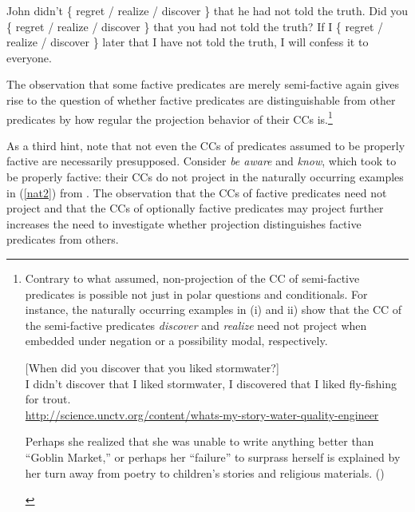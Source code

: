 \documentclass[11pt,fleqn]{article}
\newcommand{\6}{\mbox{$[\hspace*{-.6mm}[$}}
\newcommand{\9}{\mbox{$]\hspace*{-.6mm}]$}}
\begin{document}
\begin{exe}
\ex\label{kart2} \citealt[63f.]{karttunen71b}
\begin{xlist}
\ex John didn't \{ regret / realize / discover \} that he had not told the truth.
\ex  Did you \{ regret / realize / discover \} that you had not told the truth?
\ex  If I \{ regret / realize / discover \} later that I have not told the truth, I will confess it to everyone.
\end{xlist}
\end{exe}
The observation that some factive predicates are merely semi-factive again gives rise to the question of whether factive predicates are distinguishable from other predicates by how regular the projection behavior of their CCs is.\footnote{Contrary to what \citealt{karttunen71b} assumed, non-projection of the CC of semi-factive predicates is possible not just in polar questions and conditionals. For instance, the naturally occurring examples in (i) and ii) show that the CC of the semi-factive predicates {\em discover} and {\em realize} need not project when embedded under negation or a possibility modal, respectively.

\begin{exe}
 {[}When did you discover that you liked stormwater?] \\ I didn't discover that I liked stormwater, I discovered that I liked fly-fishing for trout.\\ \url{http://science.unctv.org/content/whats-my-story-water-quality-engineer}

 Perhaps she realized that she was unable to write anything better than ``Goblin Market,'' or perhaps her ``failure'' to surprass herself is explained by her turn away from poetry to children's stories and religious materials. \hfill (\citealt[87]{beaver-belly})
\end{exe}
}

As a third hint, note that not even the CCs of predicates assumed to be properly factive are necessarily presupposed. Consider {\em be aware} and {\em know}, which \citet{karttunen71b} took to be properly factive: their CCs do not project in the naturally occurring examples in (\ref{nat2}) from \citealt{beaver-belly}. The observation that the CCs of factive predicates need not project and that the CCs of optionally factive predicates may project further increases the need to investigate whether projection distinguishes factive predicates from others.
\end{document}
